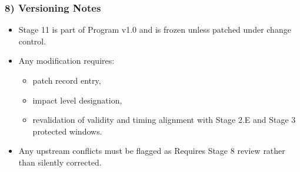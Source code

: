 \documentclass[10pt]{article}
\begin{document}
\subsubsection*{8) Versioning Notes}

\begin{itemize}
\item Stage 11 is part of Program v1.0 and is frozen unless patched under change control.
\item Any modification requires:
\begin{itemize}
\item patch record entry,
\item impact level designation,
\item revalidation of validity and timing alignment with Stage 2.E and Stage 3 protected windows.
\end{itemize}
\item Any upstream conflicts must be flagged as Requires Stage 8 review rather than silently corrected.
\end{itemize}
\end{document}
